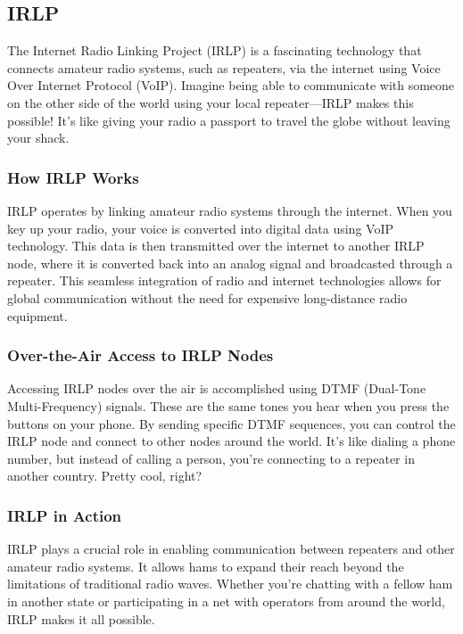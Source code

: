 \subsection{IRLP}
\label{subsec:irlp}

The Internet Radio Linking Project (IRLP) is a fascinating technology that connects amateur radio systems, such as repeaters, via the internet using Voice Over Internet Protocol (VoIP). Imagine being able to communicate with someone on the other side of the world using your local repeater—IRLP makes this possible! It’s like giving your radio a passport to travel the globe without leaving your shack.

\subsubsection*{How IRLP Works}
IRLP operates by linking amateur radio systems through the internet. When you key up your radio, your voice is converted into digital data using VoIP technology. This data is then transmitted over the internet to another IRLP node, where it is converted back into an analog signal and broadcasted through a repeater. This seamless integration of radio and internet technologies allows for global communication without the need for expensive long-distance radio equipment.

\subsubsection*{Over-the-Air Access to IRLP Nodes}
Accessing IRLP nodes over the air is accomplished using DTMF (Dual-Tone Multi-Frequency) signals. These are the same tones you hear when you press the buttons on your phone. By sending specific DTMF sequences, you can control the IRLP node and connect to other nodes around the world. It’s like dialing a phone number, but instead of calling a person, you’re connecting to a repeater in another country. Pretty cool, right?

\subsubsection*{IRLP in Action}
IRLP plays a crucial role in enabling communication between repeaters and other amateur radio systems. It allows hams to expand their reach beyond the limitations of traditional radio waves. Whether you’re chatting with a fellow ham in another state or participating in a net with operators from around the world, IRLP makes it all possible.

